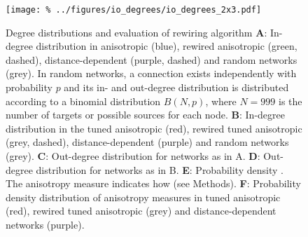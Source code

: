 

\begin{figure}[h]
  \texttt{[image: \%
    ../figures/io\_degrees/io\_degrees\_2x3.pdf]} %
  \caption{Degree distributions and evaluation of rewiring algorithm %
    \textbf{A}: In-degree distribution in anisotropic (blue), rewired
    anisotropic (green, dashed), distance-dependent (purple, dashed)
    and random networks (grey). In random networks, a connection exists
    independently with probability $p$ and its in- and out-degree distribution
    is distributed according to a binomial distribution $B(N,p)$, where
    $N=999$ is the number of targets or possible sources for each node. %
    \textbf{B}: In-degree distribution in the tuned anisotropic (red),
    rewired tuned anisotropic (grey, dashed), distance-dependent
    (purple) and random networks (grey). %
    \textbf{C}: Out-degree distribution for networks as in A. %
    \textbf{D}: Out-degree distribution for networks as in B. %
    \textbf{E}: Probability density . The anisotropy measure indicates
    how (see Methods). %
    \textbf{F}: Probability density distribution of anisotropy
    measures in tuned anisotropic (red), rewired tuned anisotropic
    (grey) and distance-dependent networks (purple).}
\label{fig:io_deg}
\end{figure}


